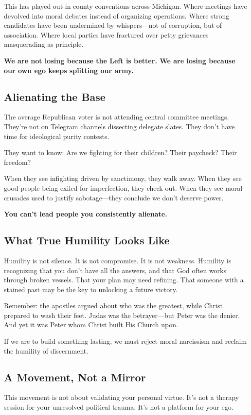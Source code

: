 This has played out in county conventions across Michigan. Where meetings have devolved into moral debates instead of organizing operations. Where strong candidates have been undermined by whispers—not of corruption, but of association. Where local parties have fractured over petty grievances masquerading as principle.

\textbf{We are not losing because the Left is better. We are losing because our own ego keeps splitting our army.}

\subsection*{Alienating the Base}
The average Republican voter is not attending central committee meetings. They’re not on Telegram channels dissecting delegate slates. They don’t have time for ideological purity contests.

They want to know: Are we fighting for their children? Their paycheck? Their freedom?

When they see infighting driven by sanctimony, they walk away. When they see good people being exiled for imperfection, they check out. When they see moral crusades used to justify sabotage—they conclude we don’t deserve power.

\textbf{You can’t lead people you consistently alienate.}

\subsection*{What True Humility Looks Like}
Humility is not silence. It is not compromise. It is not weakness. Humility is recognizing that you don’t have all the answers, and that God often works through broken vessels. That your plan may need refining. That someone with a stained past may be the key to unlocking a future victory.

Remember: the apostles argued about who was the greatest, while Christ prepared to wash their feet. Judas was the betrayer—but Peter was the denier. And yet it was Peter whom Christ built His Church upon.

If we are to build something lasting, we must reject moral narcissism and reclaim the humility of discernment.

\subsection*{A Movement, Not a Mirror}
This movement is not about validating your personal virtue. It’s not a therapy session for your unresolved political trauma. It’s not a platform for your ego.

